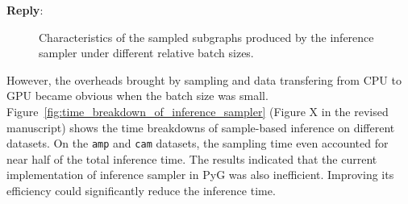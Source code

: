 \documentclass[12pt]{article}
\newenvironment{reply}
   {\medskip \noindent \textbf{Reply}:\  }
   {\medskip}
\begin{document}
\begin{reply}
     \begin{figure}[H]
        \centering
        
        \caption{Characteristics of the sampled subgraphs produced by the inference sampler under different relative batch sizes.}
        \label{fig:sampled_graph_size}
     \end{figure}
     
     However, the overheads brought by sampling and data transfering from CPU to GPU became obvious when the batch size was small.
     Figure~\ref{fig:time_breakdown_of_inference_sampler} (Figure X in the revised manuscript) shows the time breakdowns of sample-based inference on different datasets.
     On the \texttt{amp} and \texttt{cam} datasets, the sampling time even accounted for near half of the total inference time.
     The results indicated that the current implementation of inference sampler in PyG was also inefficient.
     Improving its efficiency could significantly reduce the inference time.
     

\end{reply}
\end{document}
